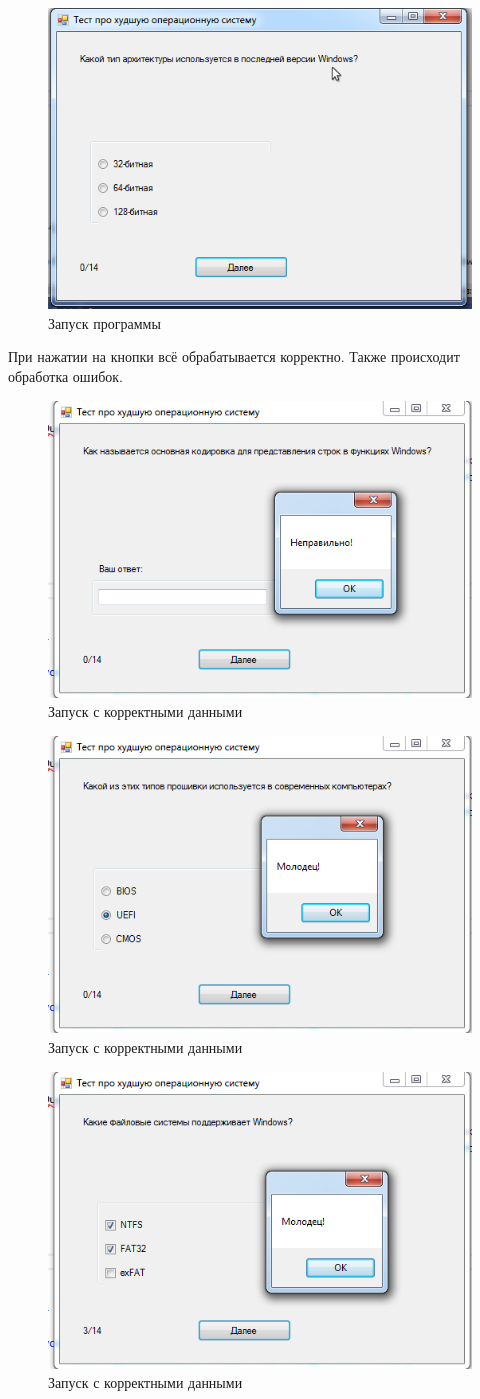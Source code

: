 \begin{figure}
\centering
\includegraphics[width=0.5\linewidth]{images//test/start.png}
\caption{Запуск программы}
\label{fig:test-start}
\end{figure}

При нажатии на кнопки всё обрабатывается корректно. Также происходит обработка ошибок.

\begin{figure}
\centering
\includegraphics[width=0.5\linewidth]{images//test/okay.png}
\caption{Запуск с корректными данными}
\label{fig:test-okay}
\end{figure}

\begin{figure}
\centering
\includegraphics[width=0.5\linewidth]{images//test/okay2.png}
\caption{Запуск с корректными данными}
\label{fig:test-okay}
\end{figure}

\begin{figure}
\centering
\includegraphics[width=0.5\linewidth]{images//test/okay3.png}
\caption{Запуск с корректными данными}
\label{fig:test-okay}
\end{figure}

